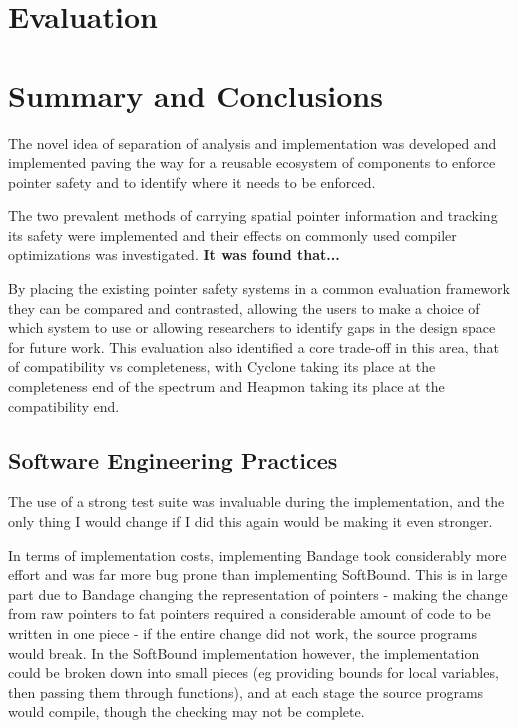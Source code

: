 \documentclass[a4paper,12pt,twoside,openright]{report}
\begin{document}
\chapter{Evaluation} 


\chapter{Summary and Conclusions} 

The novel idea of separation of analysis and implementation was developed and implemented paving the way for a reusable ecosystem of components to enforce pointer safety and to identify where it needs to be enforced.

The two prevalent methods of carrying spatial pointer information and tracking its safety were implemented and their effects on commonly used compiler optimizations was investigated.
\textbf{It was found that...}

By placing the existing pointer safety systems in a common evaluation framework they can be compared and contrasted, allowing the users to make a choice of which system to use or allowing researchers to identify gaps in the design space for future work.
This evaluation also identified a core trade-off in this area, that of compatibility vs completeness, with Cyclone taking its place at the completeness end of the spectrum and Heapmon taking its place at the compatibility end.

\section{Software Engineering Practices}

The use of a strong test suite was invaluable during the implementation, and the only thing I would change if I did this again would be making it even stronger.

In terms of implementation costs, implementing Bandage took considerably more effort and was far more bug prone than implementing SoftBound.
This is in large part due to Bandage changing the representation of pointers - making the change from raw pointers to fat pointers required a considerable amount of code to be written in one piece - if the entire change did not work, the source programs would break.
In the SoftBound implementation however, the implementation could be broken down into small pieces (eg providing bounds for local variables, then passing them through functions), and at each stage the source programs would compile, though the checking may not be complete.
\end{document}

